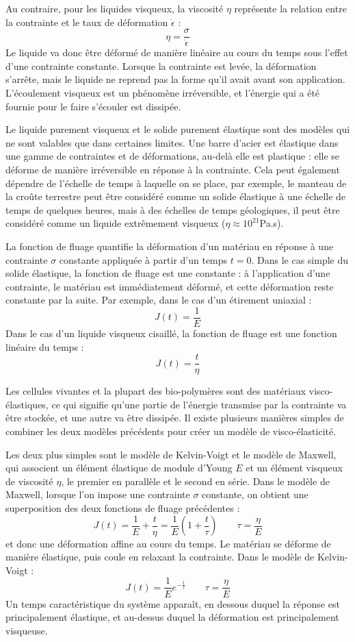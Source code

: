 Au contraire, pour les liquides visqueux, la viscosité $\eta$ représente la relation entre la contrainte et le taux de déformation $\dot{\epsilon}$ : 
$$ \eta=\frac{\sigma}{\dot{\epsilon}}$$
Le liquide va donc être déformé de manière linéaire au cours du temps sous l'effet d'une contrainte constante. Lorsque la contrainte est levée, la déformation s'arrête, mais le liquide ne reprend pas la forme qu'il avait avant son application. 
L'écoulement visqueux est un phénomène irréversible, et l'énergie qui a été fournie pour le faire s'écouler est dissipée. 

Le liquide purement visqueux et le solide purement élastique sont des modèles qui ne sont valables que dans certaines limites. Une barre d'acier est élastique dans une gamme de contraintes et de déformations, au-delà elle est plastique : elle se déforme de manière irréversible en réponse à la contrainte. 
Cela peut également dépendre de l'échelle de temps à laquelle on se place, par exemple, le manteau de la croûte terrestre peut être considéré comme un solide élastique à une échelle de temps de quelques heures, mais à des échelles de temps géologiques, il peut être considéré comme un liquide extrêmement visqueux ($\eta \approx 10^{21}$Pa.s). 


La fonction de fluage quantifie la déformation d'un matériau en réponse à une contrainte $\sigma$ constante appliquée à partir d'un temps $t=0$. 
Dans le cas simple du solide élastique, la fonction de fluage est une constante : à l'application d'une contrainte, le matériau est immédiatement déformé, et cette déformation reste constante par la suite. Par exemple, dans le cas d'un étirement uniaxial : 
$$J(t)=\frac{1}{E}$$
Dans le cas d'un liquide visqueux cisaillé, la fonction de fluage est une fonction linéaire du temps : 
$$ J(t)=\frac{t}{\eta}$$

Les cellules vivantes et la plupart des bio-polymères sont des matériaux visco-élastiques, ce qui signifie qu'une partie de l'énergie transmise par la contrainte va être stockée, et une autre va être dissipée. Il existe plusieurs manières simples de combiner les deux modèles précédents pour créer un modèle de visco-élasticité. 

Les deux plus simples sont le modèle de Kelvin-Voigt et le modèle de Maxwell, qui associent un élément élastique de module d'Young $E$ et un élément visqueux de viscosité $\eta$, le premier en parallèle et le second en série. 
Dans le modèle de Maxwell, lorsque l'on impose une contrainte $\sigma$ constante, on obtient une superposition des deux fonctions de fluage précédentes : 
$$J(t)=\frac{1}{E} + \frac{t}{\eta} = \frac{1}{E} \left( 1 + \frac{t}{\tau} \right) \qquad \tau= \frac{\eta}{E}$$ 
et donc une déformation affine au cours du temps. Le matériau se déforme de manière élastique, puis coule en relaxant la contrainte. 
Dans le modèle de Kelvin-Voigt : 
$$ J(t)=\frac{1}{E} e^{-\frac{t}{\tau}} \qquad \tau=\frac{\eta}{E}$$
Un temps caractéristique du système apparaît, en dessous duquel la réponse est principalement élastique, et au-dessus duquel la déformation est principalement visqueuse. 

